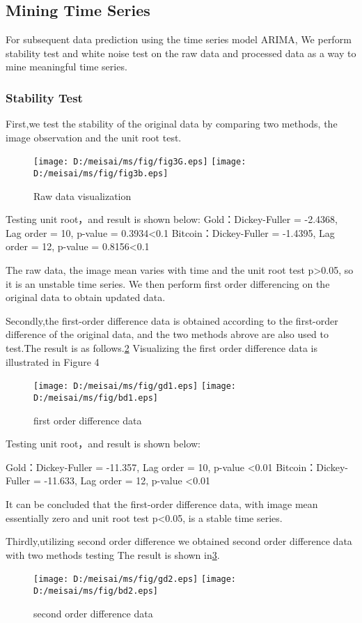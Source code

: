 \documentclass{mcmthesis}
\begin{document}
\subsection{Mining Time Series}
For subsequent data prediction using the time series model ARIMA,
We perform stability test and white noise test on the raw data and processed data as a way to mine meaningful time series.


\subsubsection{Stability Test}
First,we test the stability of the original data by comparing two methods, the image observation and the unit root test.
\begin{figure}[!hb]
  \centering 
  \texttt{[image: D:/meisai/ms/fig/fig3G.eps]}
  \texttt{[image: D:/meisai/ms/fig/fig3b.eps]}
  \caption{Raw data visualization} \label{fig3}
\end{figure}
Testing unit root，and result is shown below:
Gold：Dickey-Fuller = -2.4368, Lag order = 10, p-value = 0.3934<0.1
Bitcoin：Dickey-Fuller = -1.4395, Lag order = 12, p-value = 0.8156<0.1

The raw data, the image mean varies with time and the unit root test p>0.05, so it is an unstable time series.
We then perform first order differencing on the original data to obtain updated data.


Secondly,the first-order difference data is obtained according to the first-order difference of the original data, 
and the two methods abrove are also used to test.The result is as follows.\ref{fig4}
Visualizing the first order difference data is illustrated in Figure 4
\begin{figure}[!hb]
  \centering 
  \texttt{[image: D:/meisai/ms/fig/gd1.eps]}
  \texttt{[image: D:/meisai/ms/fig/bd1.eps]}
  \caption{first order difference data} \label{fig4}
\end{figure}

Testing unit root，and result is shown below:

Gold：Dickey-Fuller = -11.357, Lag order = 10, p-value <0.01
Bitcoin：Dickey-Fuller = -11.633, Lag order = 12, p-value <0.01

It can be concluded that the first-order difference data, with image mean essentially zero and unit root test p<0.05, is a stable time series.


Thirdly,utilizing second order difference we obtained second order difference data with two methods testing
The result is shown in\ref{fig5}.
\begin{figure}[!h]
  \centering 
  \texttt{[image: D:/meisai/ms/fig/gd2.eps]}
  \texttt{[image: D:/meisai/ms/fig/bd2.eps]}
  \caption{second order difference data} \label{fig5}
\end{figure}
\end{document}
